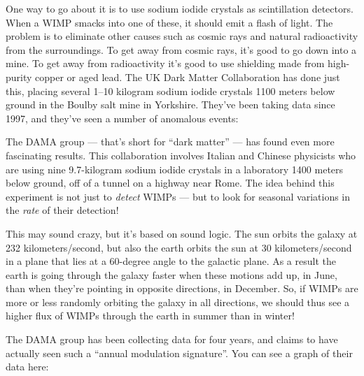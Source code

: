 \documentclass{article}
\def\tightlist{}
\renewcommand{\texttt}[1]{%
  \begingroup
  \ttfamily
  \begingroup\lccode`~=`/\lowercase{\endgroup\def~}{/\discretionary{}{}{}}%
  \begingroup\lccode`~=`[\lowercase{\endgroup\def~}{[\discretionary{}{}{}}%
  \begingroup\lccode`~=`.\lowercase{\endgroup\def~}{.\discretionary{}{}{}}%
  \catcode`/=\active\catcode`[=\active\catcode`.=\active
  \scantokens{#1\noexpand}%
  \endgroup
}
\begin{document}
One way to go about it is to use sodium iodide crystals as scintillation
detectors. When a WIMP smacks into one of these, it should emit a flash
of light. The problem is to eliminate other causes such as cosmic rays
and natural radioactivity from the surroundings. To get away from cosmic
rays, it's good to go down into a mine. To get away from radioactivity
it's good to use shielding made from high-purity copper or aged lead.
The UK Dark Matter Collaboration has done just this, placing several
1--10 kilogram sodium iodide crystals 1100 meters below ground in the
Boulby salt mine in Yorkshire. They've been taking data since 1997, and
they've seen a number of anomalous events:


The DAMA group --- that's short for ``dark matter'' --- has found even
more fascinating results. This collaboration involves Italian and
Chinese physicists who are using nine 9.7-kilogram sodium iodide
crystals in a laboratory 1400 meters below ground, off of a tunnel on a
highway near Rome. The idea behind this experiment is not just to
\emph{detect} WIMPs --- but to look for seasonal variations in the
\emph{rate} of their detection!

This may sound crazy, but it's based on sound logic. The sun orbits the
galaxy at 232 kilometers/second, but also the earth orbits the sun at 30
kilometers/second in a plane that lies at a 60-degree angle to the
galactic plane. As a result the earth is going through the galaxy faster
when these motions add up, in June, than when they're pointing in
opposite directions, in December. So, if WIMPs are more or less randomly
orbiting the galaxy in all directions, we should thus see a higher flux
of WIMPs through the earth in summer than in winter!

The DAMA group has been collecting data for four years, and claims to
have actually seen such a ``annual modulation signature''. You can see a
graph of their data here:

\end{document}
